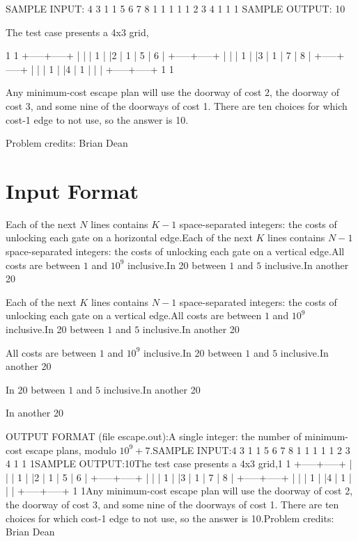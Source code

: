 \documentclass[12pt]{article}
\begin{document}
SAMPLE INPUT:
4 3
1 1
5 6
7 8
1 1
1 1 1
2 3 4
1 1 1
SAMPLE OUTPUT: 
10

The test case presents a 4x3 grid,


     1     1
  +-----+-----+
  |     |     |
1 |     |2    | 1
  |  5  |  6  |
  +-----+-----+
  |     |     |
1 |     |3    | 1
  |  7  |  8  |
  +-----+-----+
  |     |     |
1 |     |4    | 1
  |     |     |
  +-----+-----+
     1    1

Any minimum-cost escape plan will use the doorway of cost 2, the doorway of cost
3, and some nine of the doorways of cost 1. There are ten choices  for which
cost-1 edge to not use, so the answer is 10.


Problem credits: Brian Dean



\section*{Input Format}
Each of the next $N$ lines contains $K-1$ space-separated integers: the costs of
unlocking each gate on a horizontal edge.Each of the next $K$ lines contains $N-1$ space-separated integers: the costs of
unlocking each gate on a vertical edge.All costs are between $1$ and $10^9$ inclusive.In 20%
between $1$ and $5$ inclusive.In another 20%

Each of the next $K$ lines contains $N-1$ space-separated integers: the costs of
unlocking each gate on a vertical edge.All costs are between $1$ and $10^9$ inclusive.In 20%
between $1$ and $5$ inclusive.In another 20%

All costs are between $1$ and $10^9$ inclusive.In 20%
between $1$ and $5$ inclusive.In another 20%

In 20%
between $1$ and $5$ inclusive.In another 20%

In another 20%

OUTPUT FORMAT (file escape.out):A single integer: the number of minimum-cost escape plans, modulo $10^{9} + 7$.SAMPLE INPUT:4 3
1 1
5 6
7 8
1 1
1 1 1
2 3 4
1 1 1SAMPLE OUTPUT:10The test case presents a 4x3 grid,1     1
  +-----+-----+
  |     |     |
1 |     |2    | 1
  |  5  |  6  |
  +-----+-----+
  |     |     |
1 |     |3    | 1
  |  7  |  8  |
  +-----+-----+
  |     |     |
1 |     |4    | 1
  |     |     |
  +-----+-----+
     1    1Any minimum-cost escape plan will use the doorway of cost 2, the doorway of cost
3, and some nine of the doorways of cost 1. There are ten choices  for which
cost-1 edge to not use, so the answer is 10.Problem credits: Brian Dean
\end{document}
